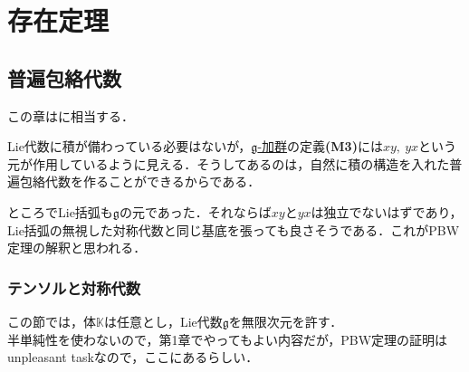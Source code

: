 \documentclass[rep_main]{subfiles}
\begin{document}
\setcounter{chapter}{4}
\chapter{存在定理}
\section{普遍包絡代数}

この章は\cite[Chapter V]{Humphreys1972introduction}に相当する．

Lie代数に積が備わっている必要はないが，\hyperref[ax:g-module]{$\mathfrak{g}$-加群}の定義\textbf{(M3)}には$xy,\ yx$という元が作用しているように見える．そうしてあるのは，自然に積の構造を入れた普遍包絡代数を作ることができるからである．

ところでLie括弧も$\mathfrak{g}$の元であった．それならば$xy$と$yx$は独立でないはずであり，Lie括弧の無視した対称代数と同じ基底を張っても良さそうである．これがPBW定理の解釈と思われる．

\subsection{テンソルと対称代数}
この節では，体$\mathbb{K}$は任意とし，Lie代数$\mathfrak{g}$を無限次元を許す．\\
半単純性を使わないので，第1章でやってもよい内容だが，PBW定理の証明はunpleasant taskなので，ここにあるらしい．
\end{document}

